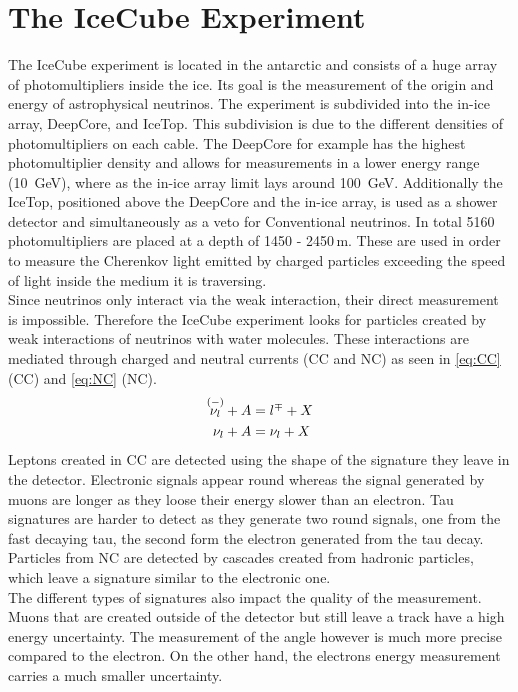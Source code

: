 \section{The IceCube Experiment}
\label{sec:The_IceCube_Experiment}
The IceCube experiment is located in the antarctic and consists of a huge array of photomultipliers inside the ice. 
Its goal is the measurement of the origin and energy of astrophysical neutrinos.
The experiment is subdivided into the in-ice array, DeepCore, and IceTop. 
This subdivision is due to the different densities of photomultipliers on each cable. 
The DeepCore for example has the highest photomultiplier density and allows for measurements in a lower energy 
range (\qty{10}{\giga\eV}), where as the in-ice array limit lays around \qty{100}{\giga\eV}.
Additionally the IceTop, positioned above the DeepCore and the in-ice array, 
is used as a shower detector and simultaneously as a veto for Conventional neutrinos.
In total 5160 photomultipliers are placed at a depth of 1450 - 2450\,\unit{\meter}. 
These are used in order to measure the Cherenkov light emitted by charged particles exceeding the speed of light inside the medium it is traversing. \\

Since neutrinos only interact via the weak interaction, their direct measurement is impossible. 
Therefore the IceCube experiment looks for particles created by weak interactions of neutrinos with water molecules. 
These interactions are mediated through charged and neutral currents (CC and NC) as seen in \autoref{eq:CC} (CC) and \autoref{eq:NC} (NC).
\begin{align}
	\overset{(-)}{\nu_l} + A &= l^\mp + X \label{eq:CC}\\
	\nu_l + A &= \nu_l + X \label{eq:NC}	
\end{align}
Leptons created in CC are detected using the shape of the signature they leave in the detector. 
Electronic signals appear round whereas the signal generated by muons
are longer as they loose their energy slower than an electron. 
Tau signatures are harder to detect as they generate two round signals, 
one from the fast decaying tau, the second form the electron generated from the tau decay.
Particles from NC are detected by cascades created from hadronic particles, 
which leave a signature similar to the electronic one.\\

The different types of signatures also impact the quality of the measurement. Muons that are created outside of the detector but still leave a track have a high energy uncertainty. The measurement of the angle however is much more precise compared to the electron. On the other hand, the electrons energy measurement carries a much smaller uncertainty.\\

